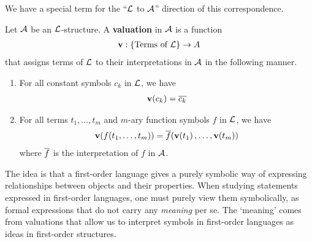 We have a special term for the ``$\mathcal{L}$ to $\mathcal{A}$'' direction of this correspondence.

\begin{boxdefinition}[Valuation]\label{Ch2:Def:Valuation}
    Let $\mathcal{A}$ be an $\mathcal{L}$-structure. A \textbf{valuation} in $\mathcal{A}$ is a function
    \begin{align*}
        \mathbf{v} : \left\{ \text{Terms of } \mathcal{L} \right\} \to A
    \end{align*}
    that assigns terms of $\mathcal{L}$ to their interpretations in $\mathcal{A}$ in the following manner.
    \begin{enumerate}
        \item For all constant symbols $c_k$ in $\mathcal{L}$, we have
        \begin{align*}
            \mathbf{v}\!\left( c_k \right) = \overline{c_k}
        \end{align*}
        
        \item For all terms $t_1, \ldots, t_m$ and $m$-ary function symbols $f$ in $\mathcal{L}$, we have
        \begin{align*}
            \mathbf{v}\!\left( f\!\left( t_1, \ldots, t_m \right) \right) = \overline{f}\!\left( \mathbf{v}\!\left( t_1 \right), \ldots, \mathbf{v}\!\left( t_m \right) \right)
        \end{align*}
        where $\overline{f}$ is the interpretation of $f$ in $\mathcal{A}$.
    \end{enumerate}
\end{boxdefinition}

The idea is that a first-order language gives a purely symbolic way of expressing relationships between objects and their properties. When studying statements expressed in first-order languages, one must purely view them symbolically, as formal expressions that do not carry any \textit{meaning} per se. The `meaning' comes from valuations that allow us to interpret symbols in first-order languages as ideas in first-order structures.

